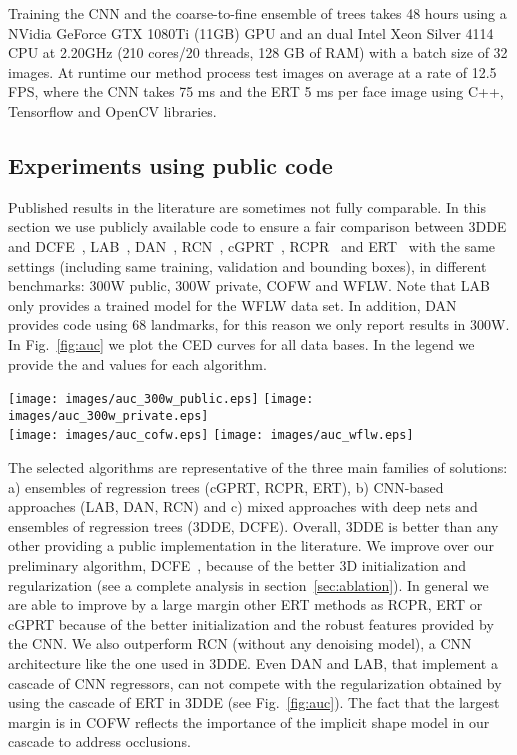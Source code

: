 \documentclass[11pt,twocolumn]{article}
\begin{document}
Training the CNN and the coarse-to-fine ensemble of trees takes 48 hours using a NVidia GeForce GTX 1080Ti (11GB) GPU and an dual Intel Xeon Silver 4114 CPU at 2.20GHz (210 cores/20 threads, 128 GB of RAM) with a batch size of 32 images. At runtime our method process test images on average at a rate of 12.5 FPS, where the CNN takes 75 ms and the ERT 5 ms per face image using C++, Tensorflow and OpenCV libraries.


\subsection{Experiments using public code}
Published results in the literature are sometimes not fully comparable. In this section we use publicly available code to ensure a fair comparison between 3DDE and DCFE~\citep{Valle18}, LAB~\citep{Wu18}, DAN~\citep{Kowalski17}, RCN~\citep{Honari16}, cGPRT~\citep{Lee15b}, RCPR~\citep{Burgos13} and ERT~\citep{Kazemi14} with the same settings (including same training, validation and bounding boxes), in different benchmarks: 300W public, 300W private, COFW and WFLW. Note that LAB~\citep{Wu18} only provides a trained model for the WFLW data set. In addition, DAN~\citep{Kowalski17} provides code using 68 landmarks, for this reason we only report results in 300W. In Fig.~\ref{fig:auc} we plot the CED curves for all data bases. In the legend we provide the  and  values for each algorithm.

\begin{figure*}
  \centering
    \texttt{[image: images/auc\_300w\_public.eps]}
    \texttt{[image: images/auc\_300w\_private.eps]}\\
    \texttt{[image: images/auc\_cofw.eps]}
    \texttt{[image: images/auc\_wflw.eps]}
  \caption{Cumulative error distribution curves sorted by AUC.}
  \label{fig:auc}
\end{figure*}

The selected algorithms are representative of the three main families of solutions: a) ensembles of regression trees (cGPRT, RCPR, ERT), b) CNN-based approaches (LAB, DAN, RCN) and c) mixed approaches with deep nets and ensembles of regression trees (3DDE, DCFE). Overall, 3DDE is better than any other providing a public implementation in the literature. We improve over our preliminary algorithm, DCFE~\cite{Valle18}, because of the better 3D initialization and regularization (see a complete analysis in section~\ref{sec:ablation}). In general we are able to improve by a large margin other ERT methods as RCPR, ERT or cGPRT because of the better initialization and the robust features provided by the CNN. We also outperform RCN (without any denoising model), a CNN architecture like the one used in 3DDE. Even DAN and LAB, that implement a cascade of CNN regressors, can not compete with the regularization obtained by using the cascade of ERT in 3DDE (see Fig.~\ref{fig:auc}). The fact that the largest margin is in COFW reflects the importance of the implicit shape model in our cascade to address occlusions.
\end{document}
